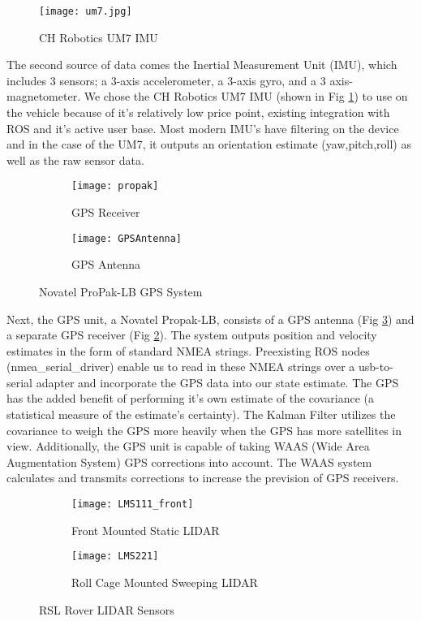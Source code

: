 \begin{figure}[H]
	\centerline{\texttt{[image: um7.jpg]}}
	\caption[]{CH Robotics UM7 IMU}
	\label{fig:imu}
\end{figure}

The second source of data comes the Inertial Measurement Unit (IMU), which includes 3 sensors; a 3-axis accelerometer, a 3-axis gyro, and a 3 axis-magnetometer. We chose the CH Robotics UM7 IMU (shown in Fig \ref{fig:imu}) to use on the vehicle because of it's relatively low price point, existing integration with ROS and it's active user base. Most modern IMU's have filtering on the device and in the case of the UM7, it outputs an orientation estimate (yaw,pitch,roll) as well as the raw sensor data. 

\begin{figure}[H]
\centering
\begin{subfigure}{.5\textwidth}
	\centering
	\texttt{[image: propak]}
	\caption{GPS Receiver}
	\label{fig:gpsrec}
\end{subfigure}%
\begin{subfigure}{.5\textwidth}
	\centering
	\texttt{[image: GPSAntenna]}
	\caption{GPS Antenna}
	\label{fig:gpsant}
\end{subfigure}
\caption{Novatel ProPak-LB GPS System}
\label{fig:gps}
\end{figure}

Next, the GPS unit, a Novatel Propak-LB, consists of a GPS antenna (Fig \ref{fig:gpsant}) and a separate GPS receiver (Fig \ref{fig:gpsrec}). The system outputs position and velocity estimates in the form of standard NMEA strings. Preexisting ROS nodes (nmea\_serial\_driver) enable us to read in these NMEA strings over a usb-to-serial adapter and incorporate the GPS data into our state estimate. The GPS has the added benefit of performing it's own estimate of the covariance (a statistical measure of the estimate's certainty). The Kalman Filter utilizes the covariance to weigh the GPS more heavily when the GPS has more satellites in view. Additionally, the GPS unit is capable of taking WAAS (Wide Area Augmentation System) GPS corrections into account. The WAAS system calculates and transmits corrections to increase the prevision of GPS receivers.

\begin{figure}[H]
	\centering
	\begin{subfigure}{.5\textwidth}
		\centering
		\texttt{[image: LMS111\_front]}
		\caption{Front Mounted Static LIDAR}
		\label{fig:lidar_front}
	\end{subfigure}%
	\begin{subfigure}{.5\textwidth}
		\centering
		\texttt{[image: LMS221]}
		\caption{Roll Cage Mounted Sweeping LIDAR}
		\label{fig:lidar_scanning}
	\end{subfigure}
	\caption{RSL Rover LIDAR Sensors}
	\label{fig:lidar}
\end{figure}

